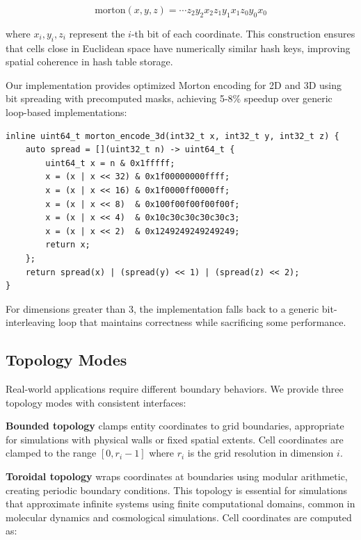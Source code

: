 \documentclass[11pt]{article}
\begin{document}
\begin{equation}
\text{morton}(x, y, z) = \cdots z_2 y_2 x_2 z_1 y_1 x_1 z_0 y_0 x_0
\end{equation}

where $x_i, y_i, z_i$ represent the $i$-th bit of each coordinate. This construction ensures that cells close in Euclidean space have numerically similar hash keys, improving spatial coherence in hash table storage.

Our implementation provides optimized Morton encoding for 2D and 3D using bit spreading with precomputed masks, achieving 5-8\% speedup over generic loop-based implementations:

\begin{lstlisting}[caption={Optimized 3D Morton encoding using bit spreading}]
inline uint64_t morton_encode_3d(int32_t x, int32_t y, int32_t z) {
    auto spread = [](uint32_t n) -> uint64_t {
        uint64_t x = n & 0x1fffff;
        x = (x | x << 32) & 0x1f00000000ffff;
        x = (x | x << 16) & 0x1f0000ff0000ff;
        x = (x | x << 8)  & 0x100f00f00f00f00f;
        x = (x | x << 4)  & 0x10c30c30c30c30c3;
        x = (x | x << 2)  & 0x1249249249249249;
        return x;
    };
    return spread(x) | (spread(y) << 1) | (spread(z) << 2);
}
\end{lstlisting}

For dimensions greater than 3, the implementation falls back to a generic bit-interleaving loop that maintains correctness while sacrificing some performance.

\subsection{Topology Modes}

Real-world applications require different boundary behaviors. We provide three topology modes with consistent interfaces:

\textbf{Bounded topology} clamps entity coordinates to grid boundaries, appropriate for simulations with physical walls or fixed spatial extents. Cell coordinates are clamped to the range $[0, r_i - 1]$ where $r_i$ is the grid resolution in dimension $i$.

\textbf{Toroidal topology} wraps coordinates at boundaries using modular arithmetic, creating periodic boundary conditions. This topology is essential for simulations that approximate infinite systems using finite computational domains, common in molecular dynamics and cosmological simulations. Cell coordinates are computed as:
\end{document}
